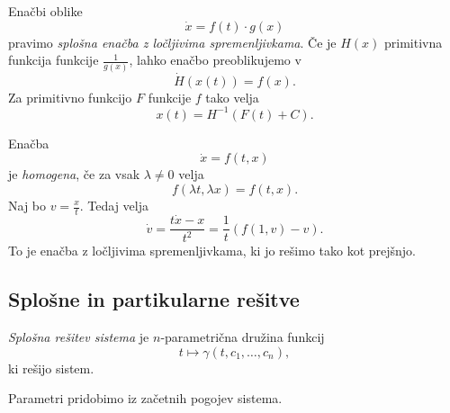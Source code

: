 \begin{primer}
Enačbi oblike
\[
\dot{x} = f(t) \cdot g(x)
\]
pravimo \emph{splošna enačba z ločljivima spremenljivkama}. Če je
$H(x)$ primitivna funkcija funkcije $\frac{1}{g(x)}$, lahko enačbo
preoblikujemo v
\[
\dot{H}(x(t)) = f(x).
\]
Za primitivno funkcijo $F$ funkcije $f$ tako velja
\[
x(t) = H^{-1}(F(t) + C).
\]
\end{primer}

\begin{primer}
Enačba
\[
\dot{x} = f(t,x)
\]
je \emph{homogena}, če za vsak $\lambda \ne 0$ velja
\[
f(\lambda t, \lambda x) = f(t,x).
\]
Naj bo $v = \frac{x}{t}$. Tedaj velja
\[
\dot{v} = \frac{t \dot{x} - x}{t^2} =
\frac{1}{t} (f(1,v) - v).
\]
To je enačba z ločljivima spremenljivkama, ki jo rešimo tako kot
prejšnjo.
\end{primer}

\newpage

\subsection{Splošne in partikularne rešitve}

\begin{definicija}
\emph{Splošna rešitev sistema} je $n$-parametrična družina funkcij
\[
t \mapsto \gamma(t, c_1, \dots, c_n),
\]
ki rešijo sistem.
\end{definicija}

\begin{opomba}
Parametri pridobimo iz začetnih pogojev sistema.
\end{opomba}
